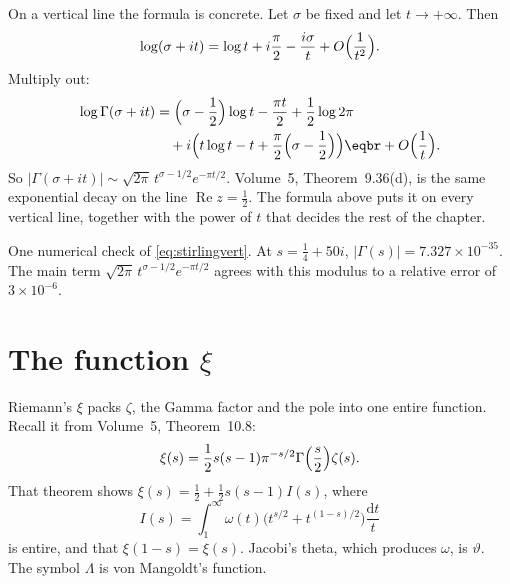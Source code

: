On a vertical line the formula is concrete. Let $\sigma$ be fixed and let $t\to+\infty$. Then
\[
\log(\sigma+it)=\log t+i\frac\pi2-\frac{i\sigma}t+O\Bigl(\frac1{t^2}\Bigr).
\]
Multiply out:
\begin{equation}\label{eq:stirlingvert}
\begin{aligned}\log\Gamma(\sigma+it)&=\Bigl(\sigma-\frac12\Bigr)\log t-\frac{\pi t}2+\frac12\log2\pi\\&\quad+i\Bigl(t\log t-t+\frac\pi2\Bigl(\sigma-\frac12\Bigr)\Bigr)\eqbr+O\Bigl(\frac1t\Bigr).\end{aligned}
\end{equation}
So $|\Gamma(\sigma+it)|\sim\sqrt{2\pi}\,t^{\sigma-1/2}e^{-\pi t/2}$. Volume~5, Theorem~9.36(d), is the same exponential decay on the line $\operatorname{Re}z=\frac12$. The formula above puts it on every vertical line, together with the power of $t$ that decides the rest of the chapter.

One numerical check of \eqref{eq:stirlingvert}. At $s=\frac14+50i$, $|\Gamma(s)|=7.327\times10^{-35}$. The main term $\sqrt{2\pi}\,t^{\sigma-1/2}e^{-\pi t/2}$ agrees with this modulus to a relative error of $3\times10^{-6}$.

\section{The function \texorpdfstring{$\xi$}{xi}}

Riemann's $\xi$ packs $\zeta$, the Gamma factor and the pole into one entire function. Recall it from Volume~5, Theorem~10.8:
\[
\xi(s)=\frac12 s(s-1)\pi^{-s/2}\Gamma\Bigl(\frac s2\Bigr)\zeta(s).
\]
That theorem shows $\xi(s)=\frac12+\frac12 s(s-1)I(s)$, where
\[
I(s)=\int_1^\infty\omega(t)\bigl(t^{s/2}+t^{(1-s)/2}\bigr)\frac{\mathrm dt}t
\]
is entire, and that $\xi(1-s)=\xi(s)$. Jacobi's theta, which produces $\omega$, is $\vartheta$. The symbol $\Lambda$ is von Mangoldt's function.


